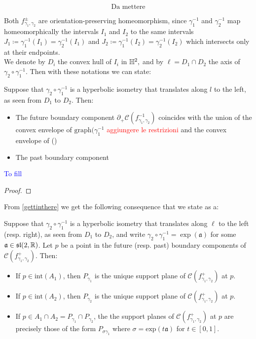 \begin{equation}
    \text{Da mettere}
\end{equation}

Both $f_{\gamma_1,\gamma_2}^{\pm}$ are orientation-preserving homeomorphism, since $\gamma_1^{-1}$ and $\gamma_2^{-1}$ map homeomorphically the intervals $I_1$ and $I_2$ to the same intervals $J_1\coloneqq\gamma_1^{-1}(I_1)=\gamma_2^{-1}(I_1)$ and $J_2\coloneqq\gamma_1^{-1}(I_2)=\gamma_2^{-1}(I_2)$ which intersects only at their endpoints. \\
We denote by $D_i$ the convex hull of $I_i$ in $\mathbb{H}^2,$ and by $\ell=D_1\cap D_2$ the axis of $\gamma_2\circ\gamma_1^{-1}$. Then with these notations we can state: 

\begin{proposition}\label{gettinthere}
    Suppose that $\gamma_2\circ\gamma_1^{-1}$ is a hyperbolic isometry that translates along $l$ to the left, as seen from $D_1$ to $D_2$. Then:
    \begin{itemize}
        \item The future boundary component $\partial_+\mathcal{C}(f_{\gamma_1,\gamma_2}^{-1})$ coincides with the union of the convex envelope of $\text{graph}(\gamma_1^{-1}$ \textcolor{red}{aggiungere le restrizioni} and the convex envelope of ()
        \item The past boundary component 
    \end{itemize}
    \textcolor{blue}{To fill}
\end{proposition}
\begin{proof}
    
\end{proof}

From \ref{gettinthere} we get the following consequence that we state as a:

\begin{corollary}
    Suppose that $\gamma_2\circ\gamma_1^{-1}$ is a hyperbolic isometry that translates along $\ell$ to the left (resp. right), as seen from $D_1$ to $D_2$, and write $\gamma_2\circ\gamma_1^{-1}=\exp(\mathfrak{a})$ for some $\mathfrak{a}\in\mathfrak{sl}(2,\mathbb{R})$. Let $p$ be a point in the future (resp. past) boundary components of $\mathcal{C}(f_{\gamma_1,\gamma_2}^{+}).$ Then:
    \begin{itemize}
        \item If $p\in\text{int}(A_1)$, then $P_{\gamma_1}$ is the unique support plane of $\mathcal{C}(f_{\gamma_1,\gamma_2}^{+})$ at $p$. 
        \item If $p\in\text{int}(A_2)$, then $P_{\gamma_2}$ is the unique support plane of $\mathcal{C}(f_{\gamma_1,\gamma_2}^{+})$ at $p$. 
        \item If $p\in A_1\cap A_2= P_{\gamma_1}\cap P_{\gamma_2}$, the the support planes of $\mathcal{C}(f_{\gamma_1,\gamma_2}^{+})$ at $p$ are precisely those of the form $P_{\sigma\gamma_1}$ where $\sigma=\text{exp}(t\mathfrak{a})$ for $t\in [0,1].$ 
    \end{itemize}
\end{corollary}

